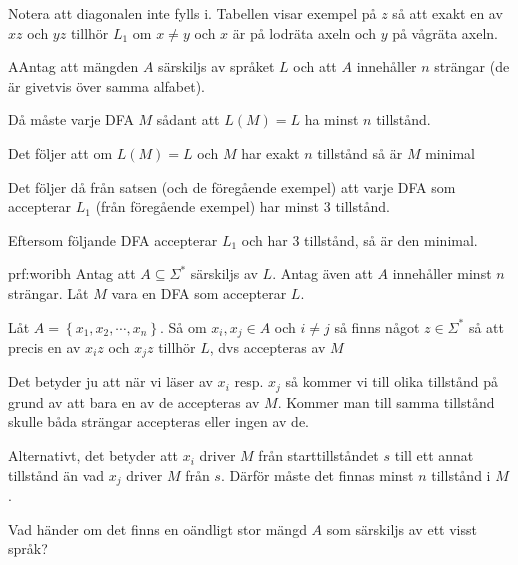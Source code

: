 \par\bigskip
\noindent Notera att diagonalen inte fylls i. Tabellen visar exempel på $z$ så att exakt en av $xz$ och $yz$ tillhör $L_1$ om $x\neq y$ och $x$ är på lodräta axeln och $y$ på vågräta axeln.
\newpage
\begin{theo}
  AAntag att mängden $A$ särskiljs av språket $L$ och att $A$ innehåller $n$ strängar (de är givetvis över samma alfabet).\par
  \noindent Då måste varje DFA $M$ sådant att $L(M)=L$ ha minst $n$ tillstånd.
  \par\bigskip
  \noindent Det följer att om $L(M)=L$ och $M$ har exakt $n$ tillstånd så är $M$ minimal
\end{theo}
\par\bigskip
\noindent Det följer då från satsen (och de föregående exempel) att varje DFA som accepterar $L_1$ (från föregående exempel) har minst 3 tillstånd.
\par\bigskip
\noindent Eftersom följande DFA accepterar $L_1$ och har 3 tillstånd, så är den minimal. 
\begin{figure}[ht!]
    \centering
    \caption{}
\end{figure}
\par\bigskip
\begin{prf}[Sats 9.7]{prf:woribh}
  Antag att $A\subseteq\Sigma^*$ särskiljs av $L$. Antag även att $A$ innehåller minst $n$ strängar. Låt $M$ vara en DFA som accepterar $L$.\par
  \noindent Låt $A = \left\{x_1,x_2,\cdots,x_n\right\}$. Så om $x_i, x_j\in A$ och $i\neq j$ så finns något $z\in\Sigma^*$ så att precis en av $x_iz$ och $x_jz$ tillhör $L$, dvs accepteras av $M$
  \par\bigskip
  \noindent Det betyder ju att när vi läser av $x_i$ resp. $x_j$ så kommer vi till olika tillstånd på grund av att bara en av de accepteras av $M$. Kommer man till samma tillstånd skulle båda strängar accepteras eller ingen av de. 
  \par\bigskip
  \noindent Alternativt, det betyder att $x_i$ driver $M$ från starttillståndet $s$ till ett annat tillstånd än vad $x_j$ driver $M$ från $s$. Därför måste det finnas minst $n$ tillstånd i $M$.
\end{prf}
\par\bigskip
\noindent Vad händer om det finns en oändligt stor mängd $A$ som särskiljs av ett visst språk?
